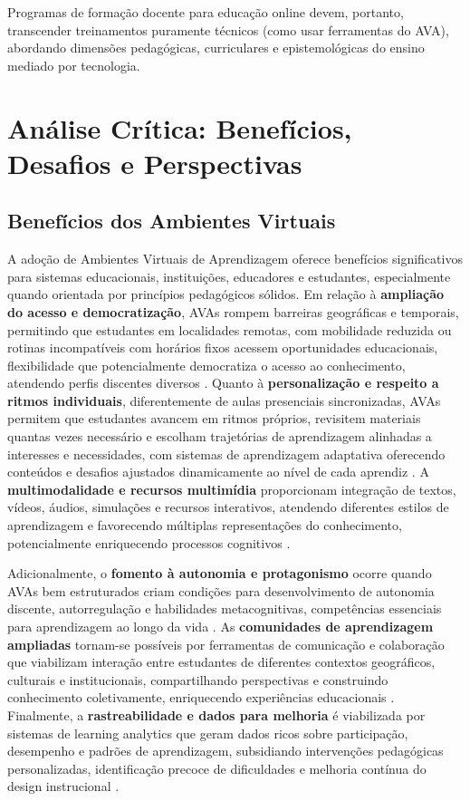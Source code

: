 \documentclass[portuguese]{sbc2025}%
\begin{document}
Programas de formação docente para educação online devem, portanto, transcender treinamentos puramente técnicos (como usar ferramentas do AVA), abordando dimensões pedagógicas, curriculares e epistemológicas do ensino mediado por tecnologia.

\section{Análise Crítica: Benefícios, Desafios e Perspectivas}
\label{sec:analise}

\subsection{Benefícios dos Ambientes Virtuais}

A adoção de Ambientes Virtuais de Aprendizagem oferece benefícios significativos para sistemas educacionais, instituições, educadores e estudantes, especialmente quando orientada por princípios pedagógicos sólidos. Em relação à \textbf{ampliação do acesso e democratização}, AVAs rompem barreiras geográficas e temporais, permitindo que estudantes em localidades remotas, com mobilidade reduzida ou rotinas incompatíveis com horários fixos acessem oportunidades educacionais, flexibilidade que potencialmente democratiza o acesso ao conhecimento, atendendo perfis discentes diversos \cite{Bates2015, UNESCO2022}. Quanto à \textbf{personalização e respeito a ritmos individuais}, diferentemente de aulas presenciais sincronizadas, AVAs permitem que estudantes avancem em ritmos próprios, revisitem materiais quantas vezes necessário e escolham trajetórias de aprendizagem alinhadas a interesses e necessidades, com sistemas de aprendizagem adaptativa oferecendo conteúdos e desafios ajustados dinamicamente ao nível de cada aprendiz \cite{Oxman2008}. A \textbf{multimodalidade e recursos multimídia} proporcionam integração de textos, vídeos, áudios, simulações e recursos interativos, atendendo diferentes estilos de aprendizagem e favorecendo múltiplas representações do conhecimento, potencialmente enriquecendo processos cognitivos \cite{Rose2002}.

Adicionalmente, o \textbf{fomento à autonomia e protagonismo} ocorre quando AVAs bem estruturados criam condições para desenvolvimento de autonomia discente, autorregulação e habilidades metacognitivas, competências essenciais para aprendizagem ao longo da vida \cite{Garrison2016}. As \textbf{comunidades de aprendizagem ampliadas} tornam-se possíveis por ferramentas de comunicação e colaboração que viabilizam interação entre estudantes de diferentes contextos geográficos, culturais e institucionais, compartilhando perspectivas e construindo conhecimento coletivamente, enriquecendo experiências educacionais \cite{Harasim2012}. Finalmente, a \textbf{rastreabilidade e dados para melhoria} é viabilizada por sistemas de learning analytics que geram dados ricos sobre participação, desempenho e padrões de aprendizagem, subsidiando intervenções pedagógicas personalizadas, identificação precoce de dificuldades e melhoria contínua do design instrucional \cite{Siemens2013, Ferguson2014}.
\end{document}
